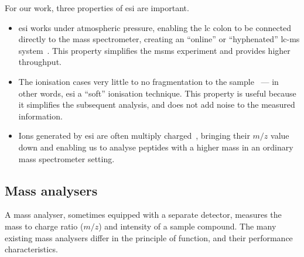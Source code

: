 For our work, three properties of \gls*{esi} are important.

\begin{itemize}
  \item \gls*{esi} works under atmospheric pressure, enabling the \gls*{lc} colon to be connected directly to the mass spectrometer, creating an ``online'' or ``hyphenated'' \gls*{lc}-\gls*{ms} system~\cite{opiteck1997comprehensive}. This property simplifies the \gls*{msms} experiment and provides higher throughput.
  \item The ionisation cases very little to no fragmentation to the sample~\cite{griffiths2001electrospray} --- in other words, \gls*{esi} a ``soft'' ionisation technique. This property is useful because it simplifies the subsequent analysis, and does not add noise to the measured information.
  \item  Ions generated by \gls*{esi} are often multiply charged~\cite{felitsyn2002origin}, bringing their \(m/z\) value down and enabling us to analyse peptides with a higher mass in an ordinary mass spectrometer setting.
\end{itemize}

\subsection{Mass analysers}\label{sec:msms-analysis}

A mass analyser, sometimes equipped with a separate detector, measures the mass to charge ratio (\(m/z\)) and intensity of a sample compound. The many existing mass analysers differ in the principle of function, and their performance characteristics.

